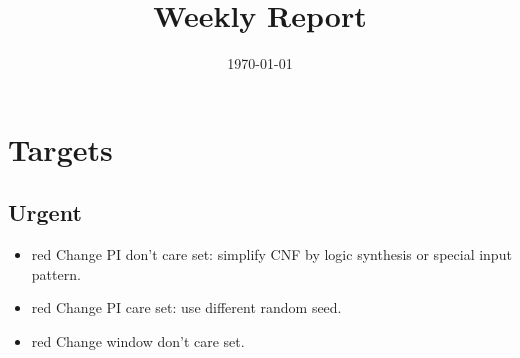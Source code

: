 \documentclass{rpt}
\title{Weekly Report}
\author{}
\date{\today}
\begin{document}
\maketitle

\section{Targets}

\subsection{Urgent}
\begin{itemize}
    \item
        \begin{color}{red}
            Change PI don't care set: simplify CNF by logic synthesis or special input pattern.
        \end{color}
    \item
        \begin{color}{red}
            Change PI care set: use different random seed.
        \end{color}
    \item
        \begin{color}{red}
            Change window don't care set.
        \end{color}
\end{itemize}
\end{document}
